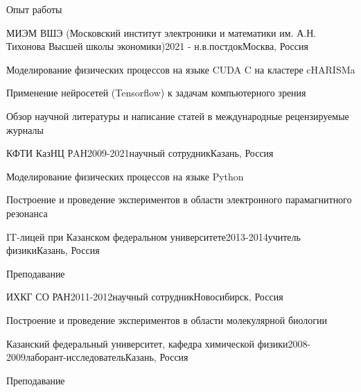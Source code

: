 \documentclass[
	a4paper, %
	11pt, %
]{resume} %
\begin{document}
\begin{rSection}{Опыт работы}

	\begin{rSubsection}{МИЭМ ВШЭ (Московский институт электроники и математики им. А.Н. Тихонова Высшей школы экономики)}{2021 - н.в.}{постдок}{Москва, Россия}
		\item Моделирование физических процессов на языке CUDA C на кластере cHARISMa
		\item Применение нейросетей (Tensorflow) к задачам компьютерного зрения
		\item Обзор научной литературы и написание статей в международные рецензируемые журналы
	\end{rSubsection}


	\begin{rSubsection}{КФТИ КазНЦ РAН}{2009-2021}{научный сотрудник}{Казань, Россия}
		\item Моделирование физических процессов на языке Python
		\item Построение и проведение экспериментов в области электронного парамагнитного резонанса
	\end{rSubsection}


	\begin{rSubsection}{IT-лицей при Казанском федеральном университете}{2013-2014}{учитель физики}{Казань, Россия}
		\item Преподавание
	\end{rSubsection}


	\begin{rSubsection}{ИХКГ СО РАН}{2011-2012}{научный сотрудник}{Новосибирск, Россия}
		\item Построение и проведение экспериментов в области молекулярной биологии
	\end{rSubsection}


	\begin{rSubsection}{Казанский федеральный университет, кафедра химической физики}{2008-2009}{лаборант-исследователь}{Казань, Россия}
		\item Преподавание
	\end{rSubsection}


\end{rSection}
\end{document}
